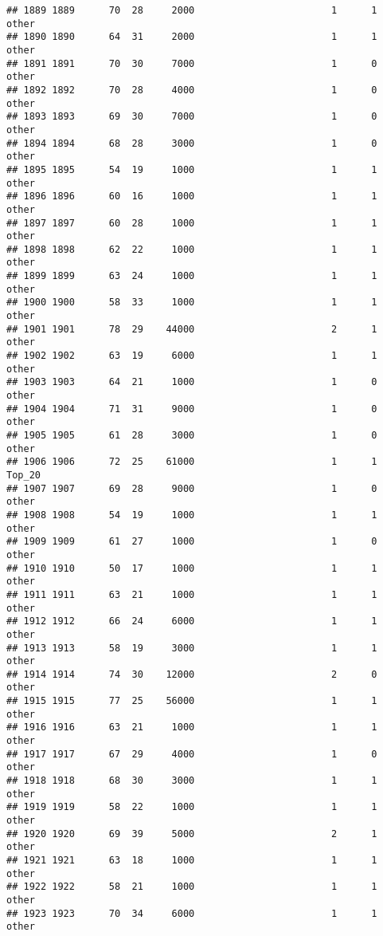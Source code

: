 \documentclass[
]{article}
\begin{document}
\begin{verbatim}
## 1889 1889      70  28     2000                        1      1    other
## 1890 1890      64  31     2000                        1      1    other
## 1891 1891      70  30     7000                        1      0    other
## 1892 1892      70  28     4000                        1      0    other
## 1893 1893      69  30     7000                        1      0    other
## 1894 1894      68  28     3000                        1      0    other
## 1895 1895      54  19     1000                        1      1    other
## 1896 1896      60  16     1000                        1      1    other
## 1897 1897      60  28     1000                        1      1    other
## 1898 1898      62  22     1000                        1      1    other
## 1899 1899      63  24     1000                        1      1    other
## 1900 1900      58  33     1000                        1      1    other
## 1901 1901      78  29    44000                        2      1    other
## 1902 1902      63  19     6000                        1      1    other
## 1903 1903      64  21     1000                        1      0    other
## 1904 1904      71  31     9000                        1      0    other
## 1905 1905      61  28     3000                        1      0    other
## 1906 1906      72  25    61000                        1      1   Top_20
## 1907 1907      69  28     9000                        1      0    other
## 1908 1908      54  19     1000                        1      1    other
## 1909 1909      61  27     1000                        1      0    other
## 1910 1910      50  17     1000                        1      1    other
## 1911 1911      63  21     1000                        1      1    other
## 1912 1912      66  24     6000                        1      1    other
## 1913 1913      58  19     3000                        1      1    other
## 1914 1914      74  30    12000                        2      0    other
## 1915 1915      77  25    56000                        1      1    other
## 1916 1916      63  21     1000                        1      1    other
## 1917 1917      67  29     4000                        1      0    other
## 1918 1918      68  30     3000                        1      1    other
## 1919 1919      58  22     1000                        1      1    other
## 1920 1920      69  39     5000                        2      1    other
## 1921 1921      63  18     1000                        1      1    other
## 1922 1922      58  21     1000                        1      1    other
## 1923 1923      70  34     6000                        1      1    other

\end{verbatim}
\end{document}
